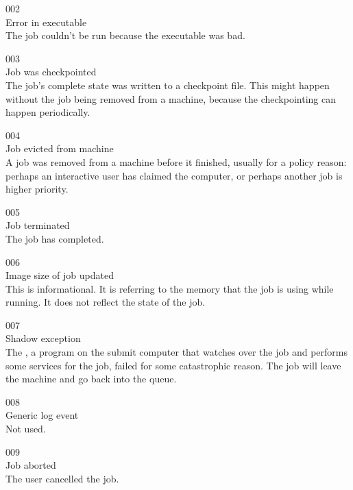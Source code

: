 \noindent{} 002 \\
 Error in executable \\
 The job couldn't be run because the
executable was bad.

\noindent{} 003 \\
 Job was checkpointed \\
 The job's complete state was written to a checkpoint
file.  
This might happen without the job being removed from a machine,
because the checkpointing can happen periodically. 

\noindent{} 004 \\
 Job evicted from machine \\
 A job was removed from a machine before it finished,
usually for a policy reason: perhaps an interactive user has claimed
the computer, or perhaps another job is higher priority.

\noindent{} 005 \\
 Job terminated \\
 The job has completed.

\noindent{} 006 \\
 Image size of job updated \\
 This is informational. 
It is referring to the memory that the job is using while running. It
does not reflect the state of the job.

\noindent{} 007 \\
 Shadow exception \\
The , a program on the submit computer that watches
over the job and performs some services for the job, failed for some
catastrophic reason. The job will leave the machine and go back into
the queue.

\noindent{} 008 \\
 Generic log event \\
 Not used.

\noindent{} 009 \\
 Job aborted \\
 The user cancelled the job.

